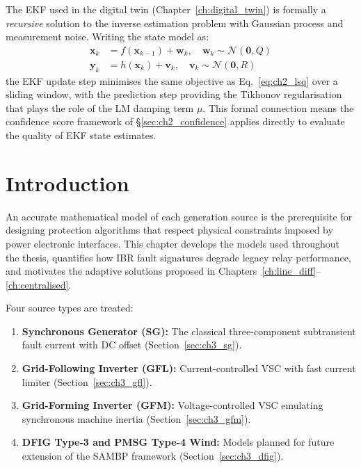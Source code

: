 The EKF used in the digital twin (Chapter~\ref{ch:digital_twin}) is
formally a \emph{recursive} solution to the inverse estimation problem
with Gaussian process and measurement noise. Writing the state model as:
\begin{align}
  \mathbf{x}_k &= f(\mathbf{x}_{k-1}) + \mathbf{w}_k, \quad
    \mathbf{w}_k \sim \mathcal{N}(\mathbf{0}, Q) \\
  \mathbf{y}_k &= h(\mathbf{x}_k) + \mathbf{v}_k, \quad
    \mathbf{v}_k \sim \mathcal{N}(\mathbf{0}, R)
\end{align}
the EKF update step minimises the same objective as
Eq.~\eqref{eq:ch2_lsq} over a sliding window, with the prediction
step providing the Tikhonov regularisation that plays the role of the
LM damping term $\mu$. This formal connection means the confidence
score framework of \S\ref{sec:ch2_confidence} applies directly to
evaluate the quality of EKF state estimates.




\section{Introduction}
\label{sec:ch3_intro}

An accurate mathematical model of each generation source is the prerequisite
for designing protection algorithms that respect physical constraints imposed
by power electronic interfaces. This chapter develops the models used throughout
the thesis, quantifies how IBR fault signatures degrade legacy relay performance,
and motivates the adaptive solutions proposed in Chapters~\ref{ch:line_diff}--\ref{ch:centralised}.

Four source types are treated:
\begin{enumerate}
\item \textbf{Synchronous Generator (SG):} The classical three-component
      subtransient fault current with DC offset (Section~\ref{sec:ch3_sg}).
\item \textbf{Grid-Following Inverter (GFL):} Current-controlled VSC with
      fast current limiter (Section~\ref{sec:ch3_gfl}).
\item \textbf{Grid-Forming Inverter (GFM):} Voltage-controlled VSC emulating
      synchronous machine inertia (Section~\ref{sec:ch3_gfm}).
\item \textbf{DFIG Type-3 and PMSG Type-4 Wind:} Models planned for future
      extension of the SAMBP framework (Section~\ref{sec:ch3_dfig}).
\end{enumerate}

